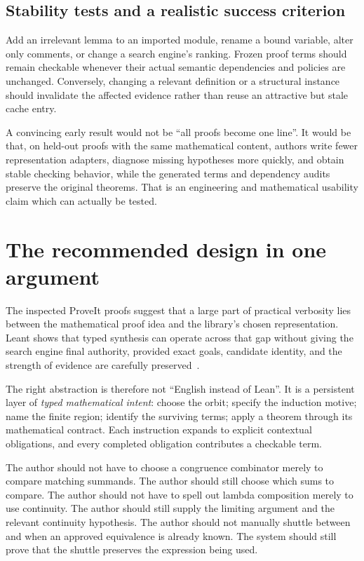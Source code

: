 \documentclass[11pt,letterpaper]{article}
\theoremstyle{definition}
\theoremstyle{remark}
\newcommand{\code}[1]{\texttt{\detokenize{#1}}}
\begin{document}
\subsection{Stability tests and a realistic success criterion}
Add an irrelevant lemma to an imported module, rename a bound variable, alter only comments, or change a search engine's ranking. Frozen proof terms should remain checkable whenever their actual semantic dependencies and policies are unchanged. Conversely, changing a relevant definition or a structural instance should invalidate the affected evidence rather than reuse an attractive but stale cache entry.

A convincing early result would not be ``all proofs become one line''. It would be that, on held-out proofs with the same mathematical content, authors write fewer representation adapters, diagnose missing hypotheses more quickly, and obtain stable checking behavior, while the generated terms and dependency audits preserve the original theorems. That is an engineering and mathematical usability claim which can actually be tested.

\section{The recommended design in one argument}
The inspected ProveIt proofs suggest that a large part of practical verbosity lies between the mathematical proof idea and the library's chosen representation. Leant shows that typed synthesis can operate across that gap without giving the search engine final authority, provided exact goals, candidate identity, and the strength of evidence are carefully preserved~\cite{prefix,affine,germ,fragment,verification}.

The right abstraction is therefore not ``English instead of Lean''. It is a persistent layer of \emph{typed mathematical intent}: choose the orbit; specify the induction motive; name the finite region; identify the surviving terms; apply a theorem through its mathematical contract. Each instruction expands to explicit contextual obligations, and every completed obligation contributes a checkable term.

The author should not have to choose a congruence combinator merely to compare matching summands. The author should still choose which sums to compare. The author should not have to spell out lambda composition merely to use continuity. The author should still supply the limiting argument and the relevant continuity hypothesis. The author should not manually shuttle between \code{Fin} and \code{Finset} when an approved equivalence is already known. The system should still prove that the shuttle preserves the expression being used.
\end{document}
